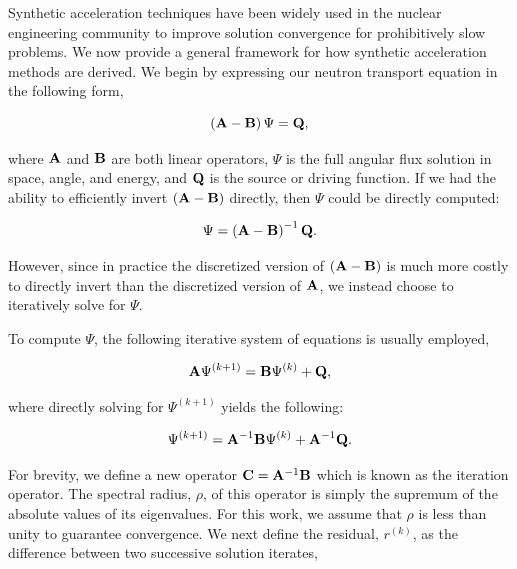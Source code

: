 Synthetic acceleration techniques have been widely used in the nuclear engineering community to improve solution convergence for prohibitively slow problems. We now provide a general framework for how synthetic acceleration methods are derived. We begin by expressing our neutron transport equation in the following form,

\begin{equation}
\label{eq::DSA_simple_trans_eq_w_ops}
\left(  {\bf A} - {\bf B}  \right) \Psi = {\bf Q} ,
\end{equation}

\noindent where ${\bf A}$ and ${\bf B}$ are both linear operators, $\Psi$ is the full angular flux solution in space, angle, and energy, and ${\bf Q}$ is the source or driving function. If we had the ability to efficiently invert $\left(  {\bf A} - {\bf B}  \right)$ directly, then $\Psi$ could be directly computed:

\begin{equation}
\label{eq::DSA_simple_trans_eq_w_ops_inverted}
\Psi = \left(  {\bf A} - {\bf B}  \right)^{-1} {\bf Q} .
\end{equation}

\noindent However, since in practice the discretized version of $\left(  {\bf A} - {\bf B}  \right)$ is much more costly to directly invert than the discretized version of ${\bf A}$, we instead choose to iteratively solve for $\Psi$.

To compute $\Psi$, the following iterative system of equations is usually employed,

\begin{equation}
\label{eq::DSA_simple_trans_eq_w_ops_iterates}
 {\bf A} \Psi^{(k+1)} ={\bf B}  \Psi^{(k)} + {\bf Q} ,
\end{equation}

\noindent where directly solving for $\Psi^{(k+1)}$ yields the following:

\begin{equation}
\label{eq::DSA_simple_trans_eq_sol_w_ops_iterates}
 \Psi^{(k+1)} =  {\bf A}^{-1} {\bf B}  \Psi^{(k)} +  {\bf A}^{-1} {\bf Q} .
\end{equation}

\noindent For brevity, we define a new operator ${\bf C} = {\bf A}^{-1} {\bf B}$ which is known as the iteration operator. The spectral radius, $\rho$, of this operator is simply the supremum of the absolute values of its eigenvalues. For this work, we assume that $\rho$ is less than unity to guarantee convergence. We next define the residual, $r^{(k)}$, as the difference between two successive solution iterates,

